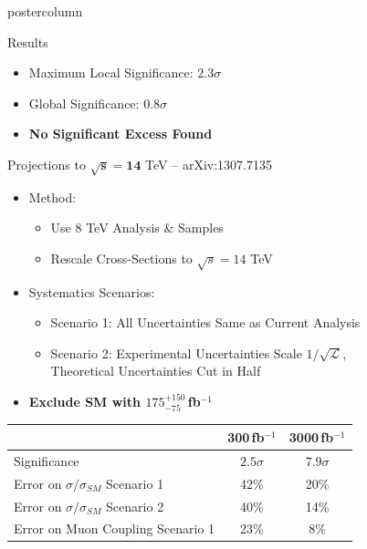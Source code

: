 \documentclass[final,hyperref={pdfpagelabels=false}]{beamer}
\newcommand{\fb}{\,fb$^{-1}$}
\begin{document}
\begin{frame}
\begin{columns}
\begin{column}{.49\textwidth}
\begin{beamercolorbox}[center,wd=\textwidth]{postercolumn}
\begin{minipage}[T]{.95\textwidth}
{\begin{block}{Results}
\begin{itemize}
                \item Maximum Local Significance: $2.3\sigma$
                \item Global Significance: $0.8\sigma$
                \item \textbf{No Significant Excess Found}
              \end{itemize}
            \end{block}
            \vfill
            \begin{block}{\boldmath Projections to $\mathbf{\sqrt{s}=14}$ TeV -- arXiv:1307.7135 }
               \begin{itemize} 
                  \item Method:
                  \begin{itemize} 
                    \item Use 8 TeV Analysis \& Samples 
                    \item Rescale Cross-Sections to $\sqrt{s}=14$ TeV
                  \end{itemize}
                  \item Systematics Scenarios:
                  \begin{itemize}
                    \item Scenario 1: All Uncertainties Same as Current Analysis
                    \item Scenario 2: Experimental Uncertainties Scale $1/\sqrt{\mathcal{L}}$, \\
                                      Theoretical Uncertainties Cut in Half
                  \end{itemize}
                  \item \textbf{\boldmath Exclude SM with $175^{+150}_{-75}$\fb}
               \end{itemize}
               \begin{center}
                      \begin{tabular}{|l|c|c|} \hline
                          & 300\fb & 3000\fb \\ \hline
                        Significance  & $2.5\sigma$ & $7.9\sigma$ \\ \hline
                        Error on $\sigma/\sigma_{SM}$ Scenario 1  & 42\% & 20\% \\ \hline
                        Error on $\sigma/\sigma_{SM}$ Scenario 2  & 40\% & 14\% \\ \hline
                        Error on Muon Coupling Scenario 1  & 23\% & 8\% \\ \hline

\end{tabular}
\end{center}
\end{block}}
\end{minipage}
\end{beamercolorbox}
\end{column}
\end{columns}
\end{frame}
\end{document}
